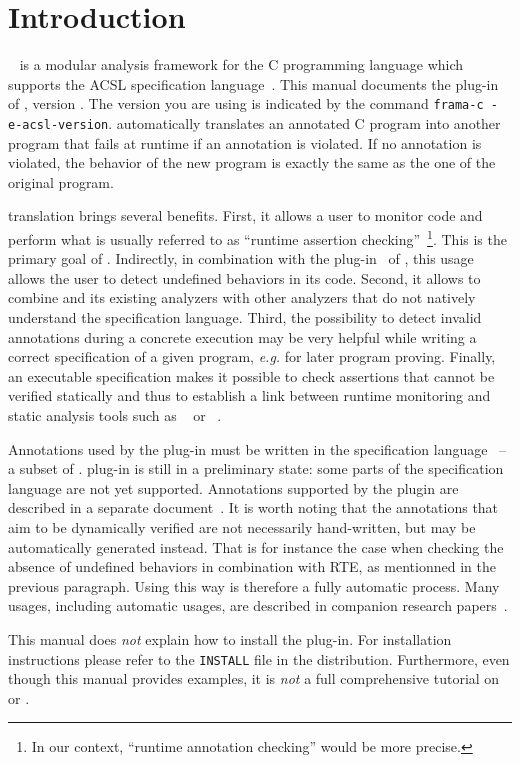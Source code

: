 \chapter{Introduction}

\framac~\cite{userman,fac15} is a modular analysis framework for the C
programming language which supports the ACSL specification
language~\cite{acsl}. This manual documents the \eacsl plug-in of \framac,
version \eacslpluginversion. The \eacsl version you are using is indicated by the
command \texttt{frama-c -e-acsl-version}. \eacsl
automatically translates an annotated C program into another program that fails
at runtime if an annotation is violated. If no annotation is violated, the
behavior of the new program is exactly the same as the one of the original
program.

\eacsl translation brings several benefits. First, it allows a user to monitor
\C code and perform what is usually referred to as ``runtime assertion
checking''~\cite{runtime-assertion-checking}\footnote{In our context, ``runtime
  annotation checking'' would be more precise.}. This is the primary goal of
\eacsl. Indirectly, in combination with the \rte plug-in~\cite{rte} of \framac,
this 
usage allows the user to detect undefined behaviors in its \C code. Second, it
allows to combine \framac and its existing analyzers with other \C analyzers
that do not natively understand the \acsl specification language. Third, the
possibility to detect invalid annotations during a concrete execution may be
very helpful while writing a correct specification of a given program,
\emph{e.g.} for later program proving.  Finally, an executable specification
makes it possible to check assertions that cannot be verified statically and
thus to establish a link between runtime monitoring and static analysis tools
such as \Eva~\cite{eva} or \wpplugin~\cite{wp}.

Annotations used by the plug-in must be written in the \eacsl specification
language~\cite{eacsl,sac13} -- a subset of \acsl. \eacsl plug-in is still in a
preliminary state: some parts of the \eacsl specification language are not yet
supported. Annotations supported by the plugin are described in a separate
document~\cite{eacsl-implem}. It is worth noting that the annotations that aim
to be dynamically verified are not necessarily hand-written, but may be
automatically generated instead. That is for instance the case when checking the
absence of undefined behaviors in combination with RTE, as mentionned in the
previous paragraph. Using \eacsl this way is therefore a fully automatic
process. Many usages, including automatic usages, are described in companion
research papers~\cite{rv13tutorial,rvcubes17tool,signoles18hdr}.

This manual does \emph{not} explain how to install the \eacsl plug-in.  For
installation instructions please refer to the \texttt{INSTALL} file in the
\eacsl distribution.  Furthermore, even though this manual
provides examples, it is \emph{not} a full comprehensive tutorial on
\framac or \eacsl.
